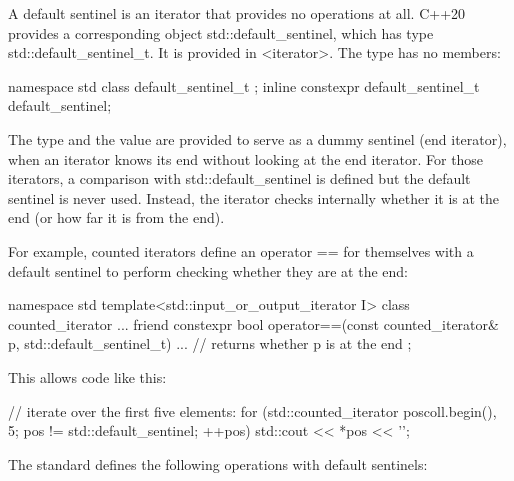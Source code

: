 A default sentinel is an iterator that provides no operations at all. C++20 provides a corresponding object std::default\_sentinel, which has type std::default\_sentinel\_t. It is provided in <iterator>. The type has no members:

\begin{cpp}
namespace std {
	class default_sentinel_t {
	};
	inline constexpr default_sentinel_t default_sentinel{};
}
\end{cpp}

The type and the value are provided to serve as a dummy sentinel (end iterator), when an iterator knows its end without looking at the end iterator. For those iterators, a comparison with std::default\_sentinel is defined but the default sentinel is never used. Instead, the iterator checks internally whether it is at the end (or how far it is from the end).

For example, counted iterators define an operator == for themselves with a default sentinel to perform checking whether they are at the end:

\begin{cpp}
namespace std {
	template<std::input_or_output_iterator I>
	class counted_iterator {
		...
		friend constexpr bool operator==(const counted_iterator& p,
		std::default_sentinel_t) {
			... // returns whether p is at the end
		}
	};
}
\end{cpp}

This allows code like this:

\begin{cpp}
// iterate over the first five elements:
for (std::counted_iterator pos{coll.begin(), 5};
pos != std::default_sentinel;
++pos) {
	std::cout << *pos << '\n';
}
\end{cpp}

The standard defines the following operations with default sentinels:

